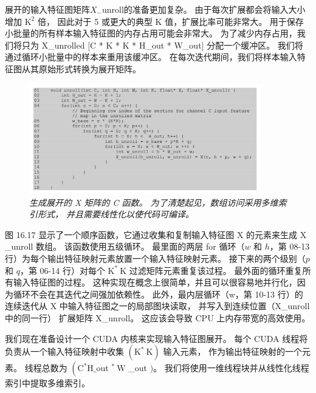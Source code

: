 展开的输入特征图矩阵$X_{-}$unroll的准备更加复杂。 由于每次扩展都会将输入大小增加 $\mathrm{K}^{2}$ 倍，
因此对于 5 或更大的典型 $\mathrm{K}$ 值，扩展比率可能非常大。 用于保存小批量的所有样本输入特征图的内存占用可能会非常大。
为了减少内存占用，我们将只为 X\_unrolled [C * K * K * H\_out * W\_out] 分配一个缓冲区。 
我们将通过循环小批量中的样本来重用该缓冲区。 在每次迭代期间，我们将样本输入特征图从其原始形式转换为展开矩阵。

\begin{figure}[H]
	\centering
	\includegraphics[width=0.9\textwidth]{figs/F16.17.png}
	\caption{\textit{生成展开的 X 矩阵的 C 函数。 为了清楚起见，数组访问采用多维索引形式，
	并且需要线性化以使代码可编译。}}
\end{figure}

图 16.17 显示了一个顺序函数，它通过收集和复制输入特征图 $\mathrm{X}$ 的元素来生成 $\mathrm{X}$ \_unroll 数组。 
该函数使用五级循环。 最里面的两层 for 循环（$w$ 和 $h$，第 08-13 行）为每个输出特征映射元素放置一个输入特征映射元素。 
接下来的两个级别（$p$ 和 $q$，第 06-14 行）对每个 $\mathrm{K}^{*} \mathrm{~K}$ 过滤矩阵元素重复该过程。 
最外面的循环重复所有输入特征图的过程。 这种实现在概念上很简单，并且可以很容易地并行化，因为循环不会在其迭代之间强加依赖性。 
此外，最内层循环（w，第 10-13 行）的连续迭代从 $\mathrm{X}$ 中输入特征图之一的局部图块读取，
并写入到连续位置（X\_unroll 中的同一行） 扩展矩阵 X\_unroll。 这应该会导致 CPU 上内存带宽的高效使用。

我们现在准备设计一个 CUDA 内核来实现输入特征图展开。 
每个 CUDA 线程将负责从一个输入特征映射中收集 $\left(\mathrm{K}^{*} \mathrm{~K}\right)$ 输入元素，
作为输出特征映射的一个元素。 
线程总数为 $\left(\mathrm{C}^{*} \mathrm{H} \_\right.$out ${ }^{*} \mathrm{~W}$ \_out $) $。 
我们将使用一维线程块并从线性化线程索引中提取多维索引。

